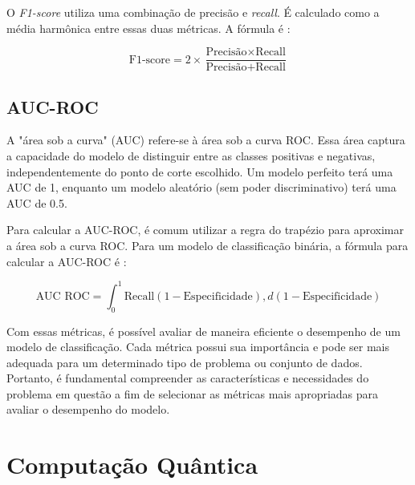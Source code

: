 O \textit{F1-score} utiliza uma combinação de precisão e \textit{recall}. É calculado como a média harmônica entre essas duas métricas. A fórmula é \cite{Métricas}:

\begin{center}
\begin{equation}
\text{F1-score} = 2 \times \dfrac{\text{Precisão} \times \text{Recall}}{\text{Precisão} + \text{Recall}}
\end{equation}
\end{center}


\subsection{AUC-ROC}

A "área sob a curva" (AUC) refere-se à área sob a curva ROC. Essa área captura a capacidade do modelo de distinguir entre as classes positivas e negativas, independentemente do ponto de corte escolhido. Um modelo perfeito terá uma AUC de 1, enquanto um modelo aleatório (sem poder discriminativo) terá uma AUC de 0.5.

Para calcular a AUC-ROC, é comum utilizar a regra do trapézio para aproximar a área sob a curva ROC. Para um modelo de classificação binária, a fórmula para calcular a AUC-ROC é \cite{Métricas}:

\begin{center}
\begin{equation}
\text{AUC ROC} = \int_{0}^{1} \text{Recall}(1-\text{Especificidade}) , d(1-\text{Especificidade})
\end{equation}
\end{center}

Com essas métricas, é possível avaliar de maneira eficiente o desempenho de um modelo de classificação. Cada métrica possui sua importância e pode ser mais adequada para um determinado tipo de problema ou conjunto de dados. Portanto, é fundamental compreender as características e necessidades do problema em questão a fim de selecionar as métricas mais apropriadas para avaliar o desempenho do modelo.


\section{Computação Quântica}


